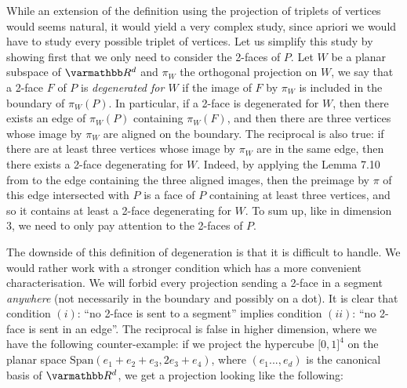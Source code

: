 \documentclass[12pt, notitlepage]{article}
\renewcommand{\mathbb}{\varmathbb}
\theoremstyle{plain}
\theoremstyle{definition}
\theoremstyle{plain}
\theoremstyle{remark}
\theoremstyle{plain}
\theoremstyle{plain}
\newcommand{\R}{\mathbb R}
\newcommand{\vect}{\text{Span}}
\begin{document}
While an extension of the definition using the projection of triplets of vertices would seems natural, it would yield a very complex study, since apriori we would have to study every possible triplet of vertices. Let us simplify this study by showing first that we only need to consider the 2-faces of $P$. Let $W$ be a planar subspace of $\R^d$ and $\pi_W$ the orthogonal projection on $W$, we say that a 2-face $F$ of $P$ is \emph{degenerated for $W$} if the image of $F$ by $\pi_W$ is included in the boundary of $\pi_W(P)$. In particular, if a 2-face is degenerated for $W$, then there exists an edge of $\pi_W(P)$ containing $\pi_W(F)$, and then there are three vertices whose image by $\pi_W$ are aligned on the boundary. The reciprocal is also true: if there are at least three vertices whose image by $\pi_W$ are in the same edge, then there exists a 2-face degenerating for $W$. Indeed, by applying the Lemma 7.10 from \cite{ZIEG} to the edge containing the three aligned images, then the preimage by $\pi$ of this edge intersected with $P$ is a face of $P$ containing at least three vertices, and so it contains at least a 2-face degenerating for $W$. To sum up, like in dimension 3, we need to only pay attention to the 2-faces of $P$.

The downside of this definition of degeneration is that it is difficult to handle. We would rather work with a stronger condition which has a more convenient characterisation. We will forbid every projection sending a 2-face in a segment \emph{anywhere} (not necessarily in the boundary and possibly on a dot). It is clear that condition $(i)$: “no 2-face is sent to a segment” implies condition $(ii)$: “no 2-face is sent in an edge”. The reciprocal is false in higher dimension, where we have the following counter-example: if we project the hypercube $\mathopen[0,1\mathclose]^4$ on the planar space $\vect(e_1+e_2+e_3,2e_3+e_4)$, where $(e_1...,e_d)$ is the canonical basis of $\R^d$, we get a projection looking like the following:
\end{document}
